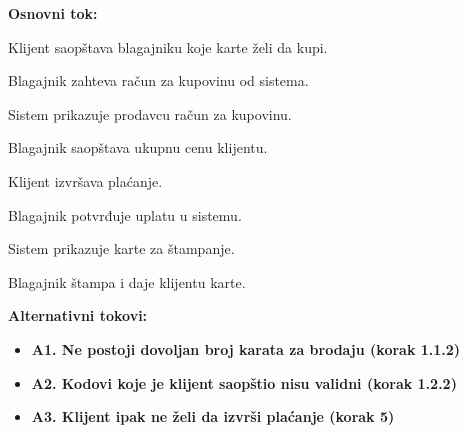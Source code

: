 \documentclass[a4paper]{article}
\begin{document}
  \noindent\textbf{Osnovni tok:}
  \begin{legal}
    \item Klijent saopštava blagajniku koje karte želi da kupi.
    \item Blagajnik zahteva račun za kupovinu od sistema.
    \item Sistem prikazuje prodavcu račun za kupovinu.
    \item Blagajnik saopštava ukupnu cenu klijentu.
    \item Klijent izvršava plaćanje.
    \item Blagajnik potvrđuje uplatu u sistemu.
    \item Sistem prikazuje karte za štampanje.
    \item Blagajnik štampa i daje klijentu karte.
  \end{legal}

  \noindent\textbf{Alternativni tokovi:} 
  \begin{itemize}
    \item \textbf{A1. Ne postoji dovoljan broj karata za brodaju (korak 1.1.2)} 
    \item \textbf{A2. Kodovi koje je klijent saopštio nisu validni (korak 1.2.2)} 
    \item \textbf{A3. Klijent ipak ne želi da izvrši plaćanje (korak 5)} 
  \end{itemize}
\end{document}
